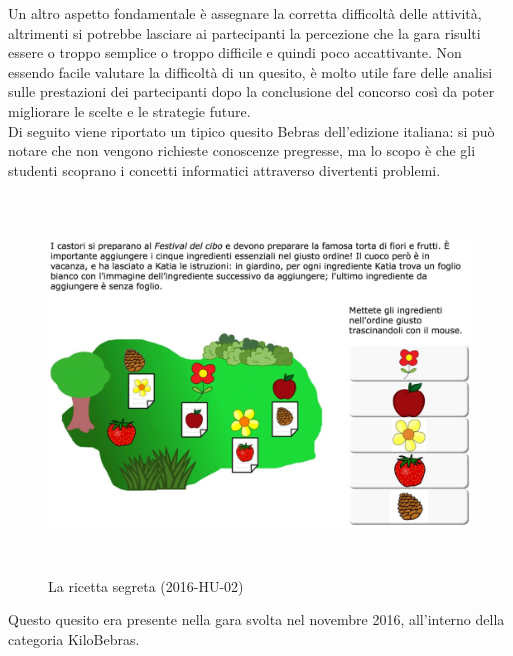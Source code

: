 \documentclass[12pt]{report}
\begin{document}
Un altro aspetto fondamentale è assegnare la corretta difficoltà delle attività, altrimenti si potrebbe lasciare ai partecipanti la percezione che la gara risulti essere o troppo semplice o troppo difficile e quindi poco accattivante.
Non essendo facile valutare la difficoltà di un quesito, è molto utile fare delle analisi sulle prestazioni dei partecipanti dopo la conclusione del concorso così da poter migliorare le scelte e le strategie future.
\\
Di seguito viene riportato un tipico quesito Bebras dell'edizione italiana: si può notare che non vengono richieste conoscenze pregresse, ma lo scopo è che gli studenti scoprano i concetti informatici attraverso divertenti problemi.
\\
\begin{figure}[H]
	\centering
	\includegraphics[height=10.0cm]{2016-HU-02Testo.png}
	\caption{La ricetta segreta (2016-HU-02)}\label{fig:1}
\end{figure}
Questo quesito era presente nella gara svolta nel novembre 2016, all'interno della categoria KiloBebras.
\end{document}
